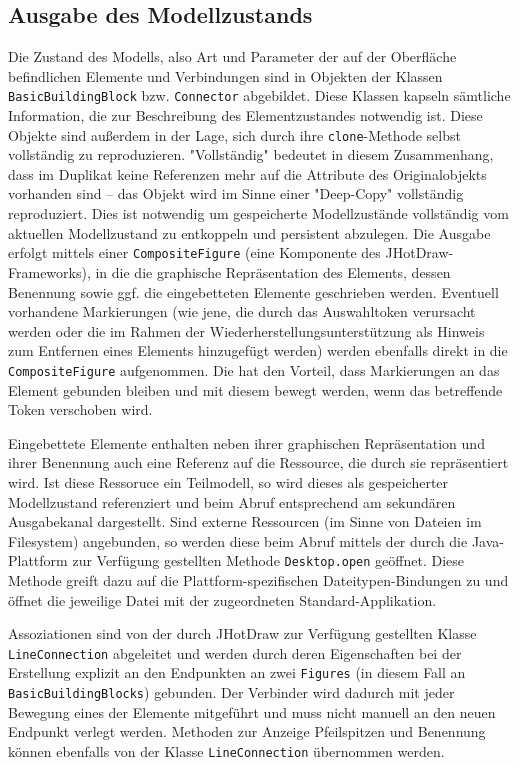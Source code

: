 \subsection{Ausgabe des Modellzustands} %
\label{sub:einsatz_von_jhotdraw}

Die Zustand des Modells, also Art und Parameter der auf der Oberfläche befindlichen Elemente und Verbindungen sind in Objekten der Klassen \texttt{BasicBuildingBlock} bzw. \texttt{Connector} abgebildet. Diese Klassen kapseln sämtliche Information, die zur Beschreibung des Elementzustandes notwendig ist. Diese Objekte sind außerdem in der Lage, sich durch ihre \texttt{clone}-Methode selbst vollständig zu reproduzieren. "Vollständig" bedeutet in diesem Zusammenhang, dass im Duplikat keine Referenzen mehr auf die Attribute des Originalobjekts vorhanden sind -- das Objekt wird im Sinne einer "Deep-Copy" vollständig reproduziert. Dies ist notwendig um gespeicherte Modellzustände vollständig vom aktuellen Modellzustand zu entkoppeln und persistent abzulegen. Die Ausgabe erfolgt mittels einer \texttt{CompositeFigure} (eine Komponente des JHotDraw-Frameworks), in die die graphische Repräsentation des Elements, dessen Benennung sowie ggf. die eingebetteten Elemente geschrieben werden. Eventuell vorhandene Markierungen (wie jene, die durch das Auswahltoken verursacht werden oder die im Rahmen der Wiederherstellungsunterstützung als Hinweis zum Entfernen eines Elements hinzugefügt werden) werden ebenfalls direkt in die \texttt{CompositeFigure} aufgenommen. Die hat den Vorteil, dass Markierungen an das Element gebunden bleiben und mit diesem bewegt werden, wenn das betreffende Token verschoben wird.

Eingebettete Elemente enthalten neben ihrer graphischen Repräsentation und ihrer Benennung auch eine Referenz auf die Ressource, die durch sie repräsentiert wird. Ist diese Ressoruce ein Teilmodell, so wird dieses als gespeicherter Modellzustand referenziert und beim Abruf entsprechend am sekundären Ausgabekanal dargestellt. Sind externe Ressourcen (im Sinne von Dateien im Filesystem) angebunden, so werden diese beim Abruf mittels der durch die Java-Plattform zur Verfügung gestellten Methode \texttt{Desktop.open} geöffnet. Diese Methode greift dazu auf die Plattform-spezifischen Dateitypen-Bindungen zu und öffnet die jeweilige Datei mit der zugeordneten Standard-Applikation. 

Assoziationen sind von der durch JHotDraw zur Verfügung gestellten Klasse \texttt{LineConnection} abgeleitet und werden durch deren Eigenschaften bei der Erstellung explizit an den Endpunkten an zwei \texttt{Figures} (in diesem Fall an \texttt{BasicBuildingBlocks}) gebunden. Der Verbinder wird dadurch mit jeder Bewegung eines der Elemente mitgeführt und muss nicht manuell an den neuen Endpunkt verlegt werden. Methoden zur Anzeige Pfeilspitzen und Benennung können ebenfalls von der Klasse \texttt{LineConnection} übernommen werden.


